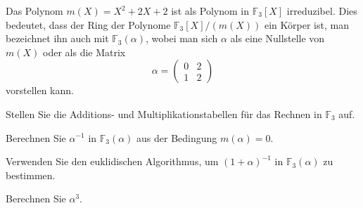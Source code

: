 Das Polynom $m(X)=X^2+2X+2$ ist als Polynom in $\mathbb{F}_3[X]$ irreduzibel.
Dies bedeutet, dass der Ring der Polynome $\mathbb{F}_3[X] / (m(X))$ 
ein Körper ist, man bezeichnet ihn auch mit $\mathbb{F}_3(\alpha)$,
wobei man sich $\alpha$ als eine Nullstelle von $m(X)$
oder als die Matrix
\[
\alpha = \begin{pmatrix} 0&2\\1&2\end{pmatrix}
\]
vorstellen kann.
\begin{teilaufgaben}
\item 
Stellen Sie die Additions- und Multiplikationstabellen für das Rechnen
in $\mathbb{F}_3$ auf.
\item
Berechnen Sie $\alpha^{-1}$ in $\mathbb{F}_3(\alpha)$ aus der
Bedingung $m(\alpha)=0$.
\item
Verwenden Sie den euklidischen Algorithmus, um $(1+\alpha)^{-1}$
in $\mathbb{F}_3(\alpha)$ zu bestimmen.
\item
Berechnen Sie $\alpha^3$.
\end{teilaufgaben}

